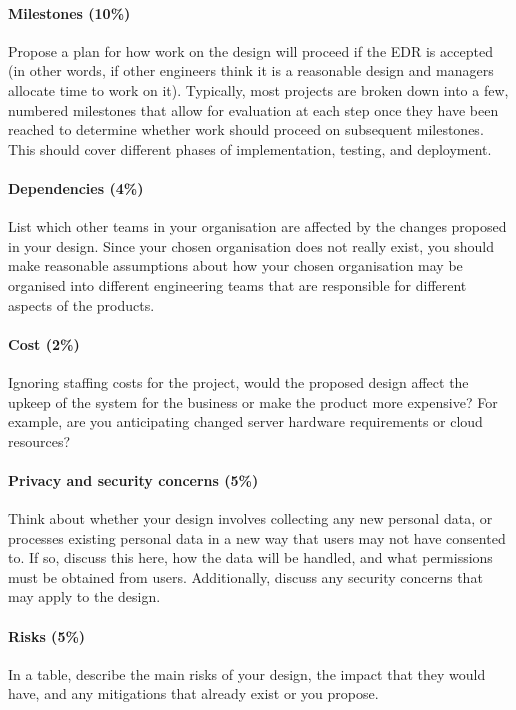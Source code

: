 \paragraph{Milestones (10\%)} Propose a plan for how work on the design will proceed if the EDR is accepted (in other words, if other engineers think it is a reasonable design and managers allocate time to work on it). Typically, most projects are broken down into a few, numbered milestones that allow for evaluation at each step once they have been reached to determine whether work should proceed on subsequent milestones. This should cover different phases of implementation, testing, and deployment.

\paragraph{Dependencies (4\%)} List which other teams in your organisation are affected by the changes proposed in your design. Since your chosen organisation does not really exist, you should make reasonable assumptions about how your chosen organisation may be organised into different engineering teams that are responsible for different aspects of the products.

\paragraph{Cost (2\%)} Ignoring staffing costs for the project, would the proposed design affect the upkeep of the system for the business or make the product more expensive? For example, are you anticipating changed server hardware requirements or cloud resources?

\paragraph{Privacy and security concerns (5\%)} Think about whether your design involves collecting any new personal data, or processes existing personal data in a new way that users may not have consented to. If so, discuss this here, how the data will be handled, and what permissions must be obtained from users. Additionally, discuss any security concerns that may apply to the design.

\paragraph{Risks (5\%)} In a table, describe the main risks of your design, the impact that they would have, and any mitigations that already exist or you propose.


